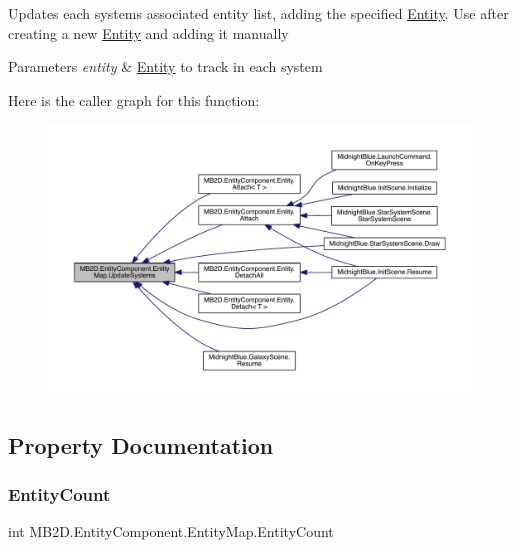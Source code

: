 Updates each systems associated entity list, adding the specified \hyperlink{class_m_b2_d_1_1_entity_component_1_1_entity}{Entity}. Use after creating a new \hyperlink{class_m_b2_d_1_1_entity_component_1_1_entity}{Entity} and adding it manually 


\begin{DoxyParams}{Parameters}
{\em entity} & \hyperlink{class_m_b2_d_1_1_entity_component_1_1_entity}{Entity} to track in each system\\
\hline
\end{DoxyParams}
Here is the caller graph for this function\+:\nopagebreak
\begin{figure}[H]
\begin{center}
\leavevmode
\includegraphics[width=350pt]{class_m_b2_d_1_1_entity_component_1_1_entity_map_ab6078e0b6eddb220b9bbf5d358d6e365_icgraph}
\end{center}
\end{figure}


\subsection{Property Documentation}
\hypertarget{class_m_b2_d_1_1_entity_component_1_1_entity_map_a607d25be9724ca759ecef96fe76ee516}{}\label{class_m_b2_d_1_1_entity_component_1_1_entity_map_a607d25be9724ca759ecef96fe76ee516} 
\subsubsection{\texorpdfstring{Entity\+Count}{EntityCount}}
{\footnotesize\ttfamily int M\+B2\+D.\+Entity\+Component.\+Entity\+Map.\+Entity\+Count\hspace{0.3cm}{\ttfamily [get]}}




